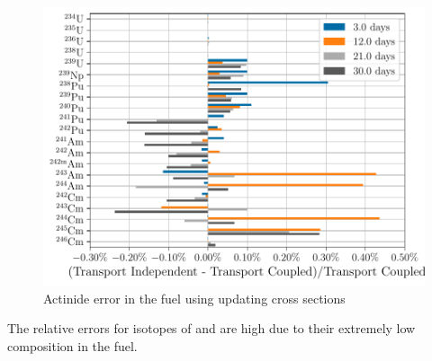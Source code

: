     \begin{figure}[htpb]
        \centering
        \includegraphics[width=\linewidth]{figs/actinides_updating_xs_predictor_fission_q_days.pdf}
        \caption[]{Actinide error in the fuel using updating cross sections}
        \label{fig:actinides-error-updating-xs}
    \end{figure}
    The relative errors for isotopes of  and  are high
    due to their extremely low composition in the fuel.
